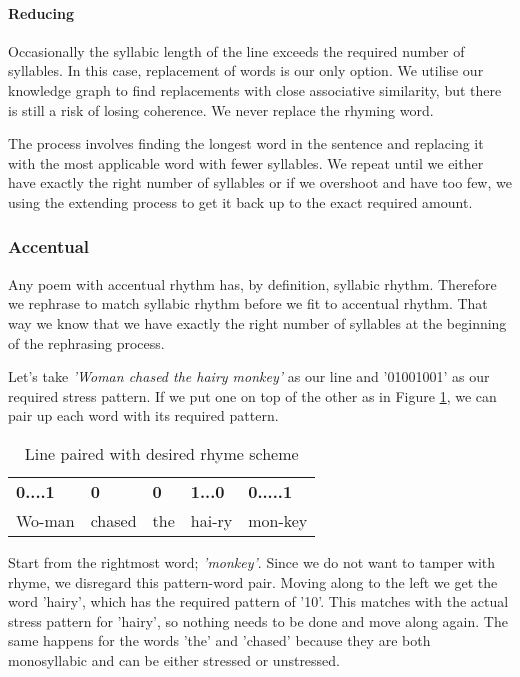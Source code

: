 \paragraph{Reducing}
Occasionally the syllabic length of the line exceeds the required number of syllables. In this case, replacement of words is our only option. We utilise our knowledge graph to find replacements  with close associative similarity, but there is still a risk of losing coherence. We never replace the rhyming word.

The process involves finding the longest word in the sentence and replacing it with the most applicable word with fewer syllables. We repeat until we either have exactly the right number of syllables or if we overshoot and have too few, we using the extending process to get it back up to the exact required amount.

\subsubsection{Accentual}
Any poem with accentual rhythm has, by definition, syllabic rhythm. Therefore we rephrase to match syllabic rhythm before we fit to accentual rhythm. That way we know that we have exactly the right number of syllables at the beginning of the rephrasing process.

Let's take \textit{'Woman chased the hairy monkey'} as our line and '01001001' as our required stress pattern. If we put one on top of the other as in Figure \ref{tab:rs-pair}, we can pair up each word with its required pattern.

\begin{table}
\centering
    \begin{tabular}{lllll}
    \textbf{0....1}      & \textbf{0}        & \textbf{0}  & \textbf{1...0}   & \textbf{0.....1}     \\
    Wo-man & chased & the & hai-ry & mon-key \\
    \end{tabular}
\caption{Line paired with desired rhyme scheme}
\label{tab:rs-pair}
\end{table}

Start from the rightmost word; \textit{'monkey'}. Since we do not want to tamper with rhyme, we disregard this pattern-word pair. Moving along to the left we get the word 'hairy', which has the required pattern of '10'. This matches with the actual stress pattern for 'hairy', so nothing needs to be done and move along again. The same happens for the words 'the' and 'chased' because they are both monosyllabic and can be either stressed or unstressed.

